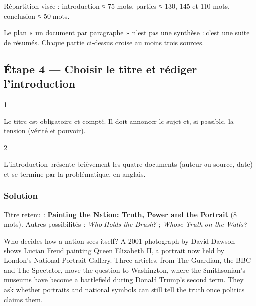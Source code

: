 \documentclass[11pt,a4paper]{article}
\begin{document}
Répartition visée : introduction ≈ 75 mots, parties ≈ 130, 145 et 110 mots, conclusion ≈ 50 mots.

\begin{piege}

Le plan « un document par paragraphe » n'est pas une synthèse : c'est une suite de résumés. Chaque partie ci-dessus croise au moins trois sources.

\end{piege}

\hypertarget{uxe9tape-4-choisir-le-titre-et-ruxe9diger-lintroduction}{%
\subsection{Étape 4 --- Choisir le titre et rédiger l'introduction}\label{uxe9tape-4-choisir-le-titre-et-ruxe9diger-lintroduction}}

\begin{indication}{1}

Le titre est obligatoire et compté. Il doit annoncer le sujet et, si possible, la tension (vérité et pouvoir).

\end{indication}

\begin{indication}{2}

L'introduction présente brièvement les quatre documents (auteur ou source, date) et se termine par la problématique, en anglais.

\end{indication}

\hypertarget{solution-3}{%
\subsubsection{Solution}\label{solution-3}}

Titre retenu : \textbf{Painting the Nation: Truth, Power and the Portrait} (8 mots). Autres possibilités : \emph{Who Holds the Brush?} ; \emph{Whose Truth on the Walls?}

Who decides how a nation sees itself? A 2001 photograph by David Dawson shows Lucian Freud painting Queen Elizabeth II, a portrait now held by London's National Portrait Gallery. Three articles, from The Guardian, the BBC and The Spectator, move the question to Washington, where the Smithsonian's museums have become a battlefield during Donald Trump's second term. They ask whether portraits and national symbols can still tell the truth once politics claims them.
\end{document}
